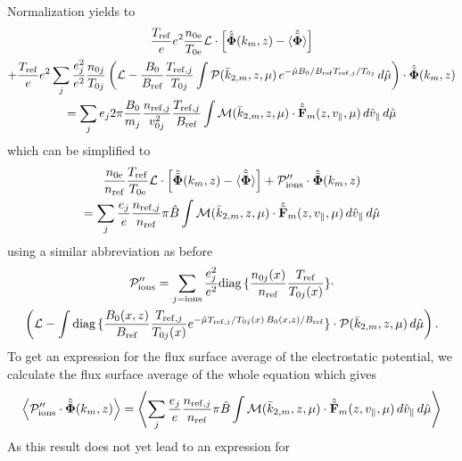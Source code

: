 Normalization yields to
\begin{multline*}
  \frac{T_{\mathrm{ref}}}{e}e^2\frac{n_{0\mathrm{e}}}{T_{0\mathrm{e}}} \mathcal{L}\cdot\left[
    \hat{\tilde{\mathbf{\Phi}}}(k_m,z)-\hat{\tilde{\mathbf{\langle\Phi\rangle}}}\right]\\
  +\frac{T_{\mathrm{ref}}}{e} e^2 \sum_{j}\frac{e_j^2}{e^2}\frac{n_{0j}}{T_{0j}}\left(
    \mathcal{L}-\frac{B_0}{B_{\mathrm{ref}}}\frac{T_{\mathrm{ref},j}}{T_{0j}}\int \mathcal{P}(\bar{k}_{2,m},z,\mu)
    \,e^{-\hat{\mu} B_0/B_{\mathrm{ref}} T_{\mathrm{ref},j}/T_{0j}}\,d\hat{\mu}
  \right)\cdot\hat{\tilde{\mathbf{\Phi}}}(k_m,z) \\
  = \sum_j e_j 2\pi\frac{B_0}{m_j}\frac{n_{\mathrm{ref},j}}{v_{0j}^2}\frac{T_{\mathrm{ref},j}}{B_{\mathrm{ref}}}\int 
  \mathcal{M}(\bar{k}_{2,m},z,\mu)\cdot\hat{\tilde{\mathbf{F}}}_m(z,v_\|,\mu)\,d\hat{v}_\|\,d\hat{\mu}
\end{multline*} 
which can be simplified to
\begin{multline}
  \label{eq:qnfull}
  \frac{n_{0\mathrm{e}}}{n_{\mathrm{ref}}} \frac{T_{\mathrm{ref}}}{T_{0\mathrm{e}}} \mathcal{L}\cdot\left[
    \hat{\tilde{\mathbf{\Phi}}}(k_m,z)-\hat{\tilde{\mathbf{\langle\Phi\rangle}}}\right]
  +\mathcal{P}_{\mathrm{ions}}''\cdot\hat{\tilde{\mathbf{\Phi}}}(k_m,z) \\
  = \sum_j \frac{e_j}{e} \frac{n_{\mathrm{ref},j}}{n_{\mathrm{ref}}} \pi\hat{B}\int 
  \mathcal{M}(\bar{k}_{2,m},z,\mu)\cdot\hat{\tilde{\mathbf{F}}}_m(z,v_\|,\mu)\,d\hat{v}_\|\,d\hat{\mu}
\end{multline} 
using a similar abbreviation as before
\begin{multline*}
    \mathcal{P}_{\mathrm{ions}}'' = \sum_{j=\mathrm{ions}}\frac{e_j^2}{e^2}
  \mbox{diag}\,\{\frac{n_{0j}(x)}{n_{\mathrm{ref}}}\frac{T_{\mathrm{ref}}}{T_{0j}(x)}\}\cdot\\
  \left(\mathcal{L}
    - \int \mbox{diag}\,\{\frac{B_0(x,z)}{B_{\mathrm{ref}}}\frac{T_{\mathrm{ref},j}}{T_{0j}(x)} 
    e^{-\hat{\mu}T_{\mathrm{ref},j}/T_{0j}(x)\, B_0(x,z)/B_{\mathrm{ref}}}\} \cdot 
    \mathcal{P}(\bar{k}_{2,m},z,\mu)\,d\hat{\mu}\right).
\end{multline*}
To get an expression for the flux surface average of the electrostatic
potential, we calculate the flux surface average of the whole
equation which gives
\begin{multline*}
\left\langle\mathcal{P}_{\mathrm{ions}}''\cdot\hat{\tilde{\mathbf{\Phi}}}(k_m,z)\right\rangle
  = \left\langle\sum_j \frac{e_j}{e} \frac{n_{\mathrm{ref},j}}{n_{\mathrm{ref}}} \pi\hat{B}\int 
  \mathcal{M}(\bar{k}_{2,m},z,\mu)\cdot\hat{\tilde{\mathbf{F}}}_m(z,v_\|,\mu)\,d\hat{v}_\|\,d\hat{\mu}\right\rangle
\end{multline*} 
As this result does not yet lead to an expression for

